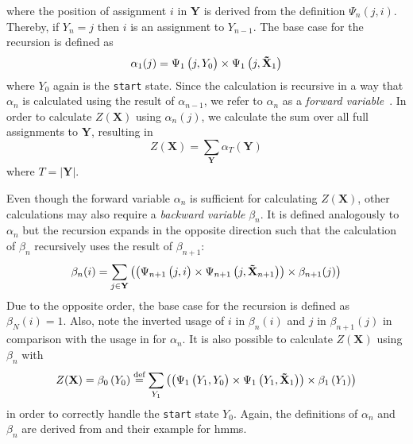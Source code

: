 where the position of assignment $i$ in $\mathbf{Y}$ is derived from the definition $\Psi_n(j,i)$.
Thereby, if $Y_n=j$ then $i$ is an assignment to $Y_{n-1}$.
The base case for the recursion is defined as
\begin{equation}
  \label{equ:linear-chain-crf-z-alpha-base}
 \alpha_1(j) = \Psi_1\left(\vphantom{\tilde{X}}j,Y_0\right)\times\Psi_1\left(j,\mathbf{\tilde{X}}_1\right)
\end{equation}
where $Y_0$ again is the \texttt{start} state. Since the calculation is recursive in a way that $\alpha_n$ is calculated using the result of $\alpha_{n-1}$, we refer to $\alpha_n$ as a \textit{forward variable}~\citep{sutton2010introduction}. In order to calculate $Z(\mathbf{X})$ using $\alpha_n(j)$, we calculate the sum over all full assignments to $\mathbf{Y}$, resulting in
\begin{equation}
  \label{equ:linear-chain-crf-z-alpha-sum}
  Z(\mathbf{X})=\sum_{\mathbf{Y}}\alpha_T\left(\mathbf{Y}\right)
\end{equation}
where $T=|\mathbf{Y}|$.
\bigskip

Even though the forward variable $\alpha_n$ is sufficient for calculating $Z(\mathbf{X})$, other calculations may also require a \textit{backward variable} $\beta_n$. It is defined analogously to $\alpha_n$ but the recursion expands in the opposite direction such that the calculation of $\beta_n$ recursively uses the result of $\beta_{n+1}$:
\begin{equation}
  \label{equ:linear-chain-crf-z-beta}
  \beta_n(i) = \sum_{j\in\mathbf{Y}}\left(\left(\Psi_{n+1}\left(\vphantom{\tilde{X}}j,i\right)\times\Psi_{n+1}\left(j,\mathbf{\tilde{X}}_{n+1}\right)\right)\times \beta_{n+1}(j)\right)
\end{equation}
Due to the opposite order, the base case for the recursion is defined as $\beta_N(i)=1$.
Also, note the inverted usage of $i$ in $\beta_n(i)$ and $j$ in $\beta_{n+1}(j)$ in comparison with the usage in  for $\alpha_n$.
It is also possible to calculate $Z(\mathbf{X})$ using $\beta_n$ with
\begin{equation}
  \label{equ:linear-chain-crf-z-beta-sum}
  Z(\mathbf{X})=\beta_0\left(Y_0\right)\equalsdef\sum_{Y_1}\left(\left(\Psi_1\left(\vphantom{\tilde{X}}Y_1,Y_0\right)\times\Psi_1\left(Y_1,\mathbf{\tilde{X}}_1\right)\right)\times\beta_1\left(Y_1\right)\right)
\end{equation}
in order to correctly handle the \texttt{start} state $Y_0$.
Again, the definitions of $\alpha_n$ and $\beta_n$ are derived from \citet{sutton2010introduction} and their example for \glspl{hmm}.

